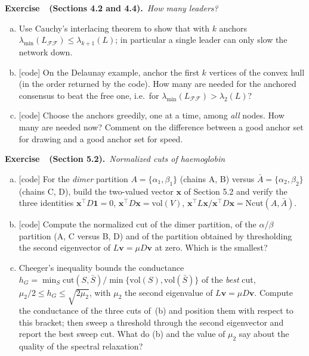 \documentclass[11pt]{article}
\newcommand{\Ncut}{\mathrm{Ncut}}
\newcommand{\cut}{\mathrm{cut}}
\newcommand{\vol}{\mathrm{vol}}
\newcounter{ex}
\newenvironment{exercise}[2]{\refstepcounter{ex}\par\bigskip\noindent
  \textbf{Exercise \theex\ \,(#1).}\ \emph{#2}\par\smallskip}{\par}
\begin{document}
\begin{exercise}{Sections 4.2 and 4.4}{How many leaders?}
\begin{enumerate}[(a)]
\item Use Cauchy's interlacing theorem to show that with $k$ anchors
$\lambda_{\min}(L_{\mathcal{FF}})\le\lambda_{k+1}(L)$; in particular a single
leader can only slow the network down.
\item \textsf{[code]} On the Delaunay example, anchor the first $k$ vertices of
the convex hull (in the order returned by the code). How many are needed for
the anchored consensus to beat the free one, i.e.\ for
$\lambda_{\min}(L_{\mathcal{FF}})>\lambda_2(L)$?
\item \textsf{[code]} Choose the anchors greedily, one at a time, among
\emph{all} nodes. How many are needed now? Comment on the difference between a
good anchor set for drawing and a good anchor set for speed.
\end{enumerate}
\end{exercise}

\begin{exercise}{Section 5.2}{Normalized cuts of haemoglobin}
\begin{enumerate}[(a)]
\item \textsf{[code]} For the \emph{dimer} partition $A=\{\alpha_1,\beta_1\}$
(chains A, B) versus $\bar A=\{\alpha_2,\beta_2\}$ (chains C, D), build the
two-valued vector $\bm x$ of Section 5.2 and verify the three identities
$\bm x^\top D\bm 1=0$, $\bm x^\top D\bm x=\vol(V)$,
$\bm x^\top L\bm x/\bm x^\top D\bm x=\Ncut(A,\bar A)$.
\item \textsf{[code]} Compute the normalized cut of the dimer partition, of the
$\alpha$/$\beta$ partition (A, C versus B, D) and of the partition obtained by
thresholding the second eigenvector of $L\bm v=\mu D\bm v$ at zero. Which is
the smallest?
\item Cheeger's inequality bounds the conductance
$h_G=\min_S\cut(S,\bar S)/\min\{\vol(S),\vol(\bar S)\}$ of the \emph{best}
cut, $\mu_2/2\le h_G\le\sqrt{2\mu_2}$, with $\mu_2$ the second eigenvalue of
$L\bm v=\mu D\bm v$. Compute the conductance of the three cuts of~(b) and
position them with respect to this bracket; then sweep a threshold through the
second eigenvector and report the best sweep cut. What do (b) and the value of
$\mu_2$ say about the quality of the spectral relaxation?
\end{enumerate}
\end{exercise}
\end{document}
